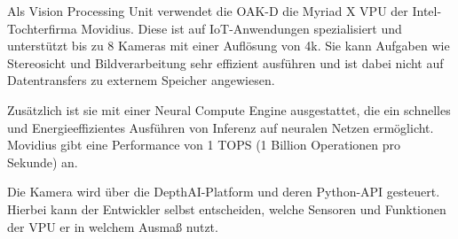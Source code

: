 Als Vision Processing Unit verwendet die OAK-D die Myriad X \ac{VPU} der Intel-Tochterfirma Movidius. Diese ist auf IoT-Anwendungen spezialisiert und unterstützt bis zu 8 Kameras mit einer Auflösung von 4k. Sie kann Aufgaben wie Stereosicht und Bildverarbeitung sehr effizient ausführen und ist dabei nicht auf Datentransfers zu externem Speicher angewiesen.

Zusätzlich ist sie mit einer Neural Compute Engine ausgestattet, die ein schnelles und Energieeffizientes Ausführen von Inferenz auf neuralen Netzen ermöglicht. Movidius gibt eine Performance von 1 TOPS (1 Billion Operationen pro Sekunde) an.

Die Kamera wird über die DepthAI-Platform und deren Python-API gesteuert. Hierbei kann der Entwickler selbst entscheiden, welche Sensoren und Funktionen der \ac{VPU} er in welchem Ausmaß nutzt.\autocite[Vgl.][]{oakd}

							 

																																																																																																																																   

